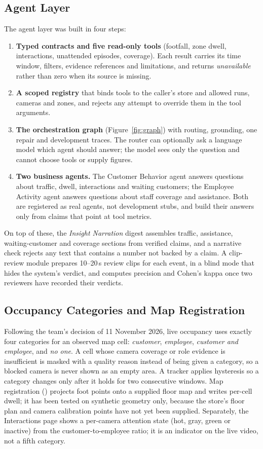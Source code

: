 \subsection{Agent Layer}
The agent layer was built in four steps:
\begin{enumerate}
\item \textbf{Typed contracts and five read-only tools} (footfall, zone dwell, interactions, unattended episodes, coverage). Each result carries its time window, filters, evidence references and limitations, and returns \emph{unavailable} rather than zero when its source is missing.
\item \textbf{A scoped registry} that binds tools to the caller's store and allowed runs, cameras and zones, and rejects any attempt to override them in the tool arguments.
\item \textbf{The orchestration graph} (Figure~\ref{fig:graph}) with routing, grounding, one repair and development traces. The router can optionally ask a language model which agent should answer; the model sees only the question and cannot choose tools or supply figures.
\item \textbf{Two business agents.} The Customer Behavior agent answers questions about traffic, dwell, interactions and waiting customers; the Employee Activity agent answers questions about staff coverage and assistance. Both are registered as real agents, not development stubs, and build their answers only from claims that point at tool metrics.
\end{enumerate}
On top of these, the \emph{Insight Narration} digest assembles traffic, assistance, waiting-customer and coverage sections from verified claims, and a narrative check rejects any text that contains a number not backed by a claim. A clip-review module prepares 10--20\,s review clips for each event, in a blind mode that hides the system's verdict, and computes precision and Cohen's kappa once two reviewers have recorded their verdicts.

\subsection{Occupancy Categories and Map Registration}
Following the team's decision of 11 November 2026, live occupancy uses exactly four categories for an observed map cell: \emph{customer}, \emph{employee}, \emph{customer and employee}, and \emph{no one}. A cell whose camera coverage or role evidence is insufficient is masked with a quality reason instead of being given a category, so a blocked camera is never shown as an empty area. A tracker applies hysteresis so a category changes only after it holds for two consecutive windows. Map registration () projects foot points onto a supplied floor map and writes per-cell dwell; it has been tested on synthetic geometry only, because the store's floor plan and camera calibration points have not yet been supplied. Separately, the Interactions page shows a per-camera attention state (hot, gray, green or inactive) from the customer-to-employee ratio; it is an indicator on the live video, not a fifth category.

